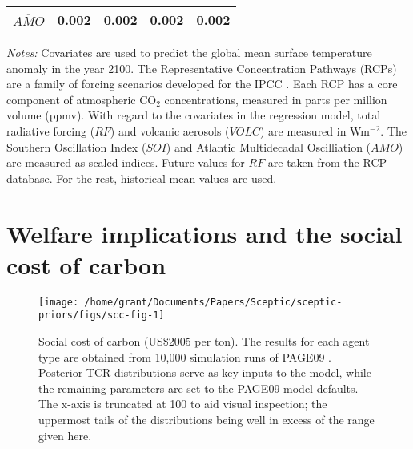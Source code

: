 \documentclass[
]{article}
\begin{document}
\begin{table}[h]
\begin{threeparttable}
\begin{tabularx}{.75\textwidth}{@{\extracolsep{1pt}} X A A A A }
            \\[-1.8ex] 
            $\overline{AMO}$                                                                    &\text{-}0.002 &\text{-}0.002   &\text{-}0.002  &\text{-}0.002  \\
            \bottomrule
        \end{tabularx}
        \begin{tablenotes}
            \footnotesize
            \item \textit{Notes:} Covariates are used to predict the global mean surface temperature anomaly in the year 2100. The Representative Concentration Pathways (RCPs) are a family of forcing scenarios developed for the IPCC \cite{van2011rcp}. Each RCP has a core component of atmospheric CO$_2$ concentrations, measured in parts per million volume (ppmv). With regard to the covariates in the regression model, total radiative forcing ($RF$) and volcanic aerosols ($VOLC$) are measured in Wm$^{-2}$. The Southern Oscillation Index ($SOI$) and Atlantic Multidecadal Oscilliation ($AMO$) are measured as scaled indices. Future values for $RF$ are taken from the RCP database. For the rest, historical mean values are used.
        \end{tablenotes}
    \end{threeparttable} 
    \label{tab:covariate}
\end{table}

\newpage
\pagebreak

\hypertarget{welfare-implications-and-the-social-cost-of-carbon}{%
\section{Welfare implications and the social cost of
carbon}\label{welfare-implications-and-the-social-cost-of-carbon}}

\begin{figure}[h]

{\centering \texttt{[image: /home/grant/Documents/Papers/Sceptic/sceptic-priors/figs/scc-fig-1]} 

}

\caption{Social cost of carbon (US\$2005 per ton). The results for each agent type are obtained from 10,000 simulation runs of PAGE09 \citep{hope2011page09}. Posterior TCR distributions serve as key inputs to the model, while the remaining parameters are set to the PAGE09 model defaults. The x-axis is truncated at 100 to aid visual inspection; the uppermost tails of the distributions being well in excess of the range given here.}\label{fig:scc-fig}
\end{figure}

\newpage

  
\end{document}
